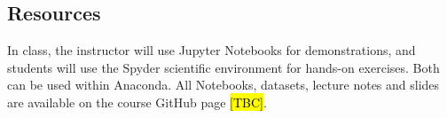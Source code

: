 \documentclass{amsart}
\theoremstyle{definition}
\theoremstyle{remark}
\numberwithin{equation}{section}
\begin{document}
\subsection*{Resources}

In class, the instructor will use Jupyter Notebooks for demonstrations, and students will use the Spyder scientific environment for hands-on exercises. Both can be used within Anaconda. All Notebooks, datasets, lecture notes and slides are available on the course GitHub page \hl{[TBC]}.

\newpage 



\end{document}
